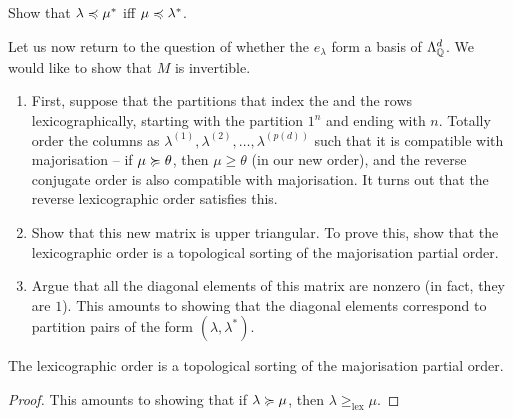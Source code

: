 
	\begin{exercise}
		Show that $\lambda \preccurlyeq \mu^*$ iff $\mu \preccurlyeq \lambda^*$.
	\end{exercise}
	
	Let us now return to the question of whether the $e_\lambda$ form a basis of $\Lambda_{\mathbb{Q}}^d$. We would like to show that $M$ is invertible.

	\begin{enumerate}
		\item First, suppose that the partitions that index the and the rows lexicographically, starting with the partition $1^n$ and ending with $n$. Totally order the columns as $\lambda^{(1)},\lambda^{(2)},\ldots,\lambda^{(p(d))}$ such that it is compatible with majorisation -- if $\mu \succcurlyeq \theta$, then $\mu \ge \theta$ (in our new order), and the reverse conjugate order is also compatible with majorisation. It turns out that the reverse lexicographic order satisfies this. 
		\item Show that this new matrix is upper triangular. To prove this, show that the lexicographic order is a topological sorting of the majorisation partial order.
		\item Argue that all the diagonal elements of this matrix are nonzero (in fact, they are $1$). This amounts to showing that the diagonal elements correspond to partition pairs of the form $(\lambda,\lambda^*)$.
	\end{enumerate}

	\begin{prop}
		\label{lem: invertible M 2}
		The lexicographic order is a topological sorting of the majorisation partial order.
	\end{prop}
	\begin{proof}
		This amounts to showing that if $\lambda \succcurlyeq \mu$, then $\lambda \ge_{\text{lex}} \mu$. 
	\end{proof}

